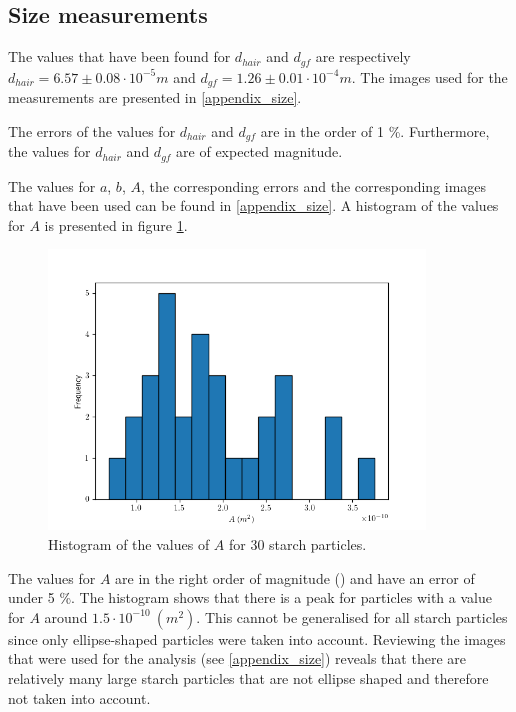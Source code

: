 \subsection{Size measurements}

The values that have been found for $d_{hair}$ and $d_{gf}$ are respectively $d_{hair} = 6.57 \pm 0.08 \cdot 10^{-5} m $ and $d_{gf} =  1.26 \pm 0.01 \cdot 10^{-4} m $. The images used for the measurements are presented in \ref{appendix_size}.

The errors of the values for $d_{hair}$ and $d_{gf}$ are in the order of 1 \%. Furthermore, the values for $d_{hair}$ and $d_{gf}$ are of expected magnitude.

\bigskip

The values for $a$, $b$, $A$, the corresponding errors and the corresponding images that have been used can be found in \ref{appendix_size}. A histogram of the values for $A$ is presented in figure \ref{fig_histogram_zetmeel}.

\begin{figure}[h!]
	\centering
    \includegraphics[width=10cm,keepaspectratio]{afbeeldingen/histogram_zetmeel.png}
    \caption{Histogram of the values of $A$ for 30 starch particles.}
    \label{fig_histogram_zetmeel}
\end{figure}

The values for $A$ are in the right order of magnitude (\cite{starch}) and have an error of under 5 \%.
The histogram shows that there is a peak for particles with a value for $A$ around $1.5 \cdot 10^{-10} \: (m^2)$. This cannot be generalised for all starch particles since only ellipse-shaped particles were taken into account. Reviewing the images that were used for the analysis (see \ref{appendix_size}) reveals that there are relatively many large starch particles that are not ellipse shaped and therefore not taken into account. 

